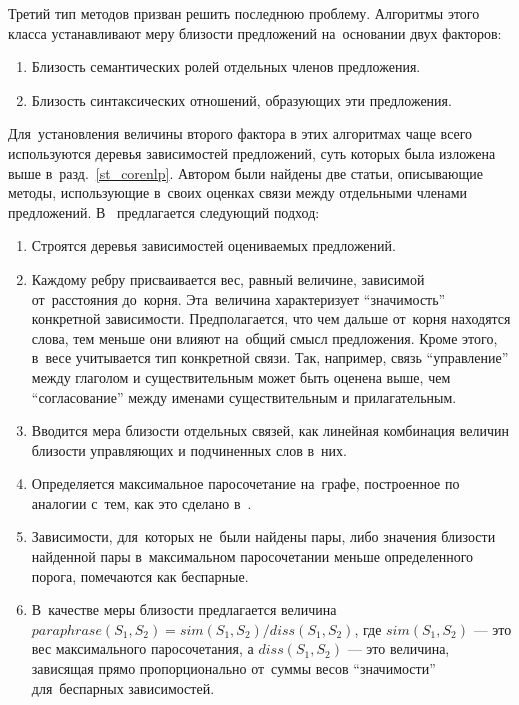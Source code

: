 Третий тип методов призван решить последнюю проблему. 
Алгоритмы этого класса устанавливают меру близости предложений на~основании двух факторов:

\begin{enumerate}

\item{
Близость семантических ролей отдельных членов предложения.
}

\item{
Близость синтаксических отношений, образующих эти предложения.
}

\end{enumerate}

Для~установления величины второго фактора в этих алгоритмах чаще всего используются
деревья зависимостей предложений, суть которых была изложена выше в~разд.~\ref{st_corenlp}.
Автором были найдены две статьи, описывающие методы, 
использующие в~своих оценках связи между отдельными членами предложений.
В~\cite{weightedDep} предлагается следующий подход:

\begin{enumerate}

\item {
Строятся деревья зависимостей оцениваемых предложений.
}

\item {
Каждому ребру присваивается вес, равный величине,  
зависимой от~расстояния до~корня. 
Эта~величина характеризует ``значимость'' конкретной зависимости.
Предполагается, что чем дальше от~корня находятся слова, тем меньше они влияют на~общий смысл предложения. 
Кроме этого, в~весе учитывается тип конкретной связи.
Так, например, связь ``управление'' между глаголом и существительным %
может быть оценена выше, чем ``согласование'' между именами существительным и прилагательным.
}

\item{
Вводится мера близости отдельных связей, как линейная комбинация
величин близости управляющих и подчиненных слов в~них.
}

\item {
Определяется максимальное паросочетание на~графе,
построенное по аналогии с~тем, как это сделано в~\cite{wordnetSim}.
}

\item {
Зависимости, для~которых не~были найдены пары, 
либо значения близости найденной пары в~максимальном паросочетании меньше определенного порога,
помечаются как беспарные.
}

\item{
В~качестве меры близости предлагается величина 
$paraphrase(S_1, S_2) = sim(S_1,S_2)/diss(S_1, S_2)$, 
где $sim(S_1, S_2)$ --- это вес максимального паросочетания,
а $diss(S_1, S_2)$ --- это величина, зависящая прямо пропорционально  
от~суммы весов ``значимости'' для~беспарных зависимостей.
}

\end{enumerate}

